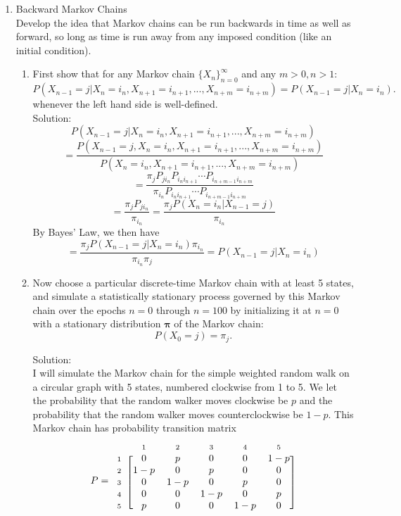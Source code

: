 \documentclass[12pt]{article}
\newcommand{\matindex}[1]{\mbox{\scriptsize#1}}
\numberwithin{equation}{section}
\begin{document}
\begin{enumerate}
\begin{enumerate}
        \end{enumerate}

\item Backward Markov Chains\\

    Develop the idea that Markov chains can be run backwards in time as well as forward, so long as time is run away from any imposed condition (like an initial condition).\\

    \begin{enumerate}
    \item First show that for any Markov chain $\{X_n\}_{n=0}^\infty$ and any $m>0,n>1$:
    $$P(X_{n-1}=j|X_n=i_n,X_{n+1}=i_{n+1},...,X_{n+m}=i_{n+m})=P(X_{n-1}=j|X_n=i_n).$$
    whenever the left hand side is well-defined.\\

    Solution:\\

    $$P(X_{n-1}=j|X_n=i_n,X_{n+1}=i_{n+1},...,X_{n+m}=i_{n+m})$$
    $$ $$
    $$=\frac{P(X_{n-1}=j,X_n=i_n,X_{n+1}=i_{n+1},...,X_{n+m}=i_{n+m})}{P(X_n=i_n,X_{n+1}=i_{n+1},...,X_{n+m}=i_{n+m})}$$
    $$ $$
    $$=\frac{\pi_jP_{ji_n}P_{i_ni_{n+1}}\cdots P_{i_{n+m-1}i_{n+m}}}{\pi_{i_n}P_{i_ni_{n+1}}\cdots P_{i_{n+m-1}i_{n+m}}}$$
    $$ $$
    $$=\frac{\pi_jP_{ji_n}}{\pi_{i_n}}=\frac{\pi_jP(X_n=i_n|X_{n-1}=j)}{\pi_{i_n}}$$
    By Bayes' Law, we then have
    $$=\frac{\pi_jP(X_{n-1}=j|X_n=i_n)\pi_{i_n}}{\pi_{i_n}\pi_j}=P(X_{n-1}=j|X_n=i_n)$$

    \item Now choose a particular discrete-time Markov chain with at least 5 states, and simulate a statistically stationary process governed by this Markov chain over the epochs $n=0$ through $n=100$ by initializing it at $n=0$ with a stationary distribution $\mathbf{\pi}$ of the Markov chain:
        $$P(X_0=j)=\pi_j.$$

        Solution:\\

        I will simulate the Markov chain for the simple weighted random walk on a circular graph with 5 states, numbered clockwise from 1 to 5. We let the probability that the random walker moves clockwise be $p$ and the probability that the random walker moves counterclockwise be $1-p$. This Markov chain has probability transition matrix
        $$P=\begin{blockarray}{cccccc}&\matindex{1}&\matindex{2}&\matindex{3}&\matindex{4}&\matindex{5}\\
        \begin{block}{c[ccccc]}\matindex{1}&0&p&0&0&1-p\\
        \matindex{2}&1-p&0&p&0&0\\
        \matindex{3}&0&1-p&0&p&0\\
        \matindex{4}&0&0&1-p&0&p\\
        \matindex{5}&p&0&0&1-p&0\\
        \end{block}
        \end{blockarray}$$


\end{enumerate}
\end{enumerate}
\end{document}
